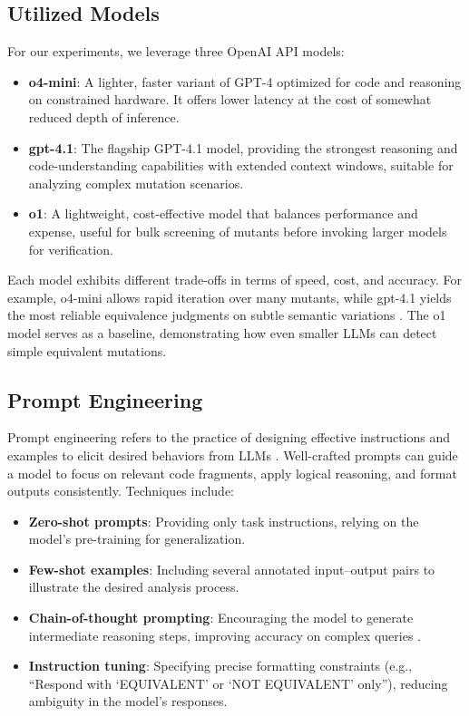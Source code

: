 \subsection{Utilized Models}

For our experiments, we leverage three OpenAI API models:

\begin{itemize}
  \item \textbf{o4-mini}: A lighter, faster variant of GPT-4 optimized for code and reasoning on constrained hardware. It offers lower latency at the cost of somewhat reduced depth of inference.
  \item \textbf{gpt-4.1}: The flagship GPT-4.1 model, providing the strongest reasoning and code-understanding capabilities with extended context windows, suitable for analyzing complex mutation scenarios.
  \item \textbf{o1}: A lightweight, cost-effective model that balances performance and expense, useful for bulk screening of mutants before invoking larger models for verification.
\end{itemize}

Each model exhibits different trade-offs in terms of speed, cost, and accuracy. For example, o4-mini allows rapid iteration over many mutants, while gpt-4.1 yields the most reliable equivalence judgments on subtle semantic variations \cite{openai2023api}. The o1 model serves as a baseline, demonstrating how even smaller LLMs can detect simple equivalent mutations.

\subsection{Prompt Engineering}

Prompt engineering refers to the practice of designing effective instructions and examples to elicit desired behaviors from LLMs \cite{liu2021pre}. Well-crafted prompts can guide a model to focus on relevant code fragments, apply logical reasoning, and format outputs consistently. Techniques include:

\begin{itemize}
  \item \textbf{Zero-shot prompts}: Providing only task instructions, relying on the model’s pre-training for generalization.
  \item \textbf{Few-shot examples}: Including several annotated input–output pairs to illustrate the desired analysis process.
  \item \textbf{Chain-of-thought prompting}: Encouraging the model to generate intermediate reasoning steps, improving accuracy on complex queries \cite{wei2022chain}.
  \item \textbf{Instruction tuning}: Specifying precise formatting constraints (e.g., “Respond with ‘EQUIVALENT’ or ‘NOT EQUIVALENT’ only”), reducing ambiguity in the model’s responses.
\end{itemize}

